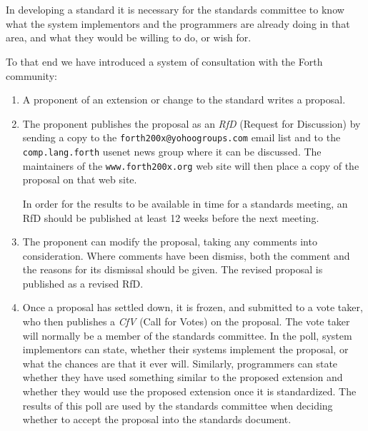 \chapter*{}

\cbstart
{}
In developing a standard it is necessary for the standards committee to
know what the system implementors and the programmers are already doing
in that area, and what they would be willing to do, or wish for.

To that end we have introduced a system of consultation with the Forth
community:

\begin{enumerate}
\item
	A proponent of an extension or change to the standard writes a
	proposal.

\item
	The proponent publishes the proposal as an \emph{RfD} (Request for
	Discussion) by sending a copy to the \texttt{forth200x@yohoogroups.com}
	email list and to the \texttt{comp.lang.forth} usenet news group
	where it can be discussed.  The maintainers of the
	\texttt{www.forth200x.org} web site will then place a copy of the
	proposal on that web site.

	In order for the results to be available in time for a standards
	meeting, an RfD should be published at least 12 weeks before the
	next meeting.

\item
	The proponent can modify the proposal, taking any comments into
	consideration.  Where comments have been dismiss, both the comment
	and the reasons for its dismissal should be given.  The revised
	proposal is published as a revised RfD.

\item
	Once a proposal has settled down, it is frozen, and submitted to a
	vote taker, who then publishes a \emph{CfV} (Call for Votes) on the
	proposal. The vote taker will normally be a member of the standards
	committee.  In the poll, system implementors can state, whether
	their systems implement the proposal, or what the chances are that
	it ever will.  Similarly, programmers can state whether they have
	used something similar to the proposed extension and whether they
	would use the proposed extension once it is standardized.  The
	results of this poll are used by the standards committee when
	deciding whether to accept the proposal into the standards document.


\end{enumerate}
